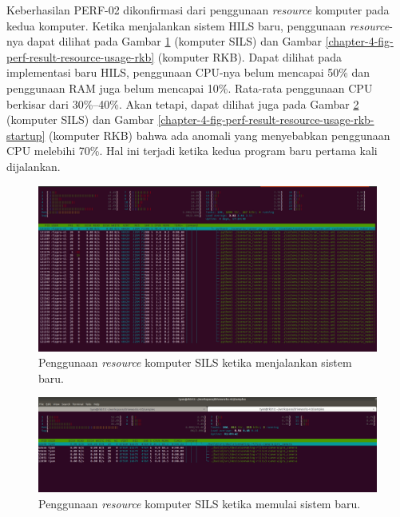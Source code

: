Keberhasilan PERF-02 dikonfirmasi dari penggunaan \textit{resource} komputer
pada kedua komputer. Ketika menjalankan sistem HILS baru, penggunaan
\textit{resource}-nya dapat dilihat pada Gambar
\ref{chapter-4-fig-perf-result-resource-usage-sils} (komputer SILS) dan Gambar
\ref{chapter-4-fig-perf-result-resource-usage-rkb} (komputer RKB). Dapat dilihat
pada implementasi baru HILS, penggunaan CPU-nya belum mencapai 50\% dan
penggunaan RAM juga belum mencapai 10\%. Rata-rata penggunaan CPU berkisar dari
30\%--40\%. Akan tetapi, dapat dilihat juga pada Gambar
\ref{chapter-4-fig-perf-result-resource-usage-sils-startup} (komputer SILS) dan
Gambar \ref{chapter-4-fig-perf-result-resource-usage-rkb-startup} (komputer RKB)
bahwa ada anomali yang menyebabkan penggunaan CPU melebihi 70\%.  Hal ini
terjadi ketika kedua program baru pertama kali dijalankan.
\begin{figure}[!htbp]
	\centering
	\includegraphics[width=1.0\textwidth]{resources/chapter-4/resource-usage-new-hils-sils-startup.png}
	\caption{Penggunaan \textit{resource} komputer SILS ketika menjalankan sistem baru.}
	\label{chapter-4-fig-perf-result-resource-usage-sils}
\end{figure}
\begin{figure}[!htbp]
	\centering
	\includegraphics[width=1.0\textwidth,trim={0cm 0cm 0cm 2.5cm},clip]{resources/chapter-4/resource-usage-new-hils-rkb.png}
	\caption{Penggunaan \textit{resource} komputer SILS ketika memulai sistem baru.}
	\label{chapter-4-fig-perf-result-resource-usage-sils-startup}
\end{figure}
